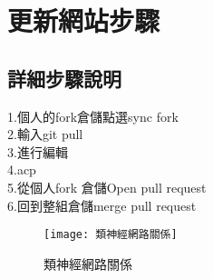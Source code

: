 \chapter{更新網站步驟}
\section{詳細步驟說明}


 1.個人的fork倉儲點選sync fork\\

2.輸入git pull\\

3.進行編輯\\

4.acp\\

5.從個人fork 倉儲Open pull request\\

6.回到整組倉儲merge pull request\\

\newpage
\begin{figure}
\begin{center}
\texttt{[image: 類神經網路關係]}
\caption{\Large 類神經網路關係}
\label{類神經網路關係}
\end{center}
\end{figure}
